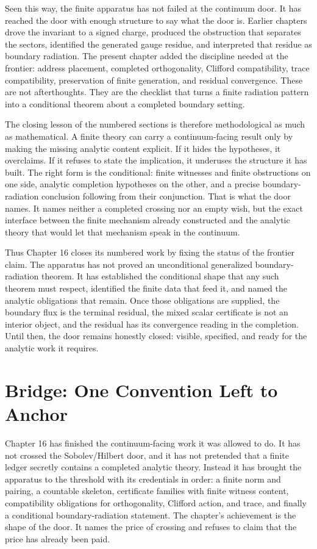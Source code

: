 Seen this way, the finite apparatus has not failed at the continuum door. It has
reached the door with enough structure to say what the door is. Earlier chapters
drove the invariant to a signed charge, produced the obstruction that separates
the sectors, identified the generated gauge residue, and interpreted that
residue as boundary radiation. The present chapter added the discipline needed
at the frontier: address placement, completed orthogonality, Clifford
compatibility, trace compatibility, preservation of finite generation, and
residual convergence. These are not afterthoughts. They are the checklist that
turns a finite radiation pattern into a conditional theorem about a completed
boundary setting.

The closing lesson of the numbered sections is therefore methodological as much
as mathematical. A finite theory can carry a continuum-facing result only by
making the missing analytic content explicit. If it hides the hypotheses, it
overclaims. If it refuses to state the implication, it underuses the structure it
has built. The right form is the conditional: finite witnesses and finite
obstructions on one side, analytic completion hypotheses on the other, and a
precise boundary-radiation conclusion following from their conjunction. That is
what the door names. It names neither a completed crossing nor an empty wish, but
the exact interface between the finite mechanism already constructed and the
analytic theory that would let that mechanism speak in the continuum.

Thus Chapter 16 closes its numbered work by fixing the status of the frontier
claim. The apparatus has not proved an unconditional generalized
boundary-radiation theorem. It has established the conditional shape that any such
theorem must respect, identified the finite data that feed it, and named the
analytic obligations that remain. Once those obligations are supplied, the
boundary flux is the terminal residual, the mixed scalar certificate is not an
interior object, and the residual has its convergence reading in the completion.
Until then, the door remains honestly closed: visible, specified, and ready for
the analytic work it requires.

\section*{Bridge: One Convention Left to Anchor}

Chapter 16 has finished the continuum-facing work it was allowed to do. It has
not crossed the Sobolev/Hilbert door, and it has not pretended that a finite
ledger secretly contains a completed analytic theory. Instead it has brought
the apparatus to the threshold with its credentials in order: a finite norm and
pairing, a countable skeleton, certificate families with finite witness
content, compatibility obligations for orthogonality, Clifford action, and
trace, and finally a conditional boundary-radiation statement. The chapter's
achievement is the shape of the door. It names the price of crossing and
refuses to claim that the price has already been paid.

